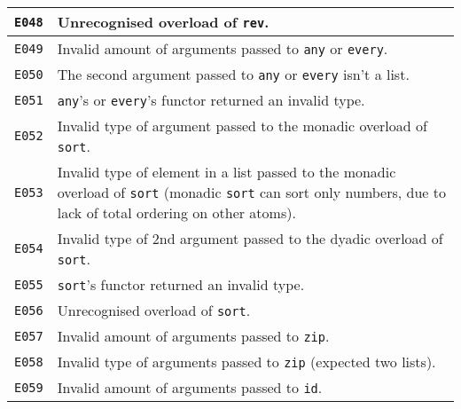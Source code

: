\begin{longtable}{ | p{6em} | p{34em} | }
\verb|E048|          & Unrecognised overload of \verb|rev|.                                                                                                           \\ \hline
\verb|E049|          & Invalid amount of arguments passed to \verb|any| or \verb|every|.                                                                              \\ \hline
\verb|E050|          & The second argument passed to \verb|any| or \verb|every| isn't a list.                                                                         \\ \hline
\verb|E051|          & \verb|any|'s or \verb|every|'s functor returned an invalid type.                                                                               \\ \hline
\verb|E052|          & Invalid type of argument passed to the monadic overload of \verb|sort|.                                                                        \\ \hline
\verb|E053|          & Invalid type of element in a list passed to the monadic overload of \verb|sort| (monadic \verb|sort| can sort only numbers, due to lack of total ordering on other atoms). \\ \hline
\verb|E054|          & Invalid type of 2nd argument passed to the dyadic overload of \verb|sort|.                                                                     \\ \hline
\verb|E055|          & \verb|sort|'s functor returned an invalid type.                                                                                                \\ \hline
\verb|E056|          & Unrecognised overload of \verb|sort|.                                                                                                          \\ \hline
\verb|E057|          & Invalid amount of arguments passed to \verb|zip|.                                                                                              \\ \hline
\verb|E058|          & Invalid type of arguments passed to \verb|zip| (expected two lists).                                                                           \\ \hline
\verb|E059|          & Invalid amount of arguments passed to \verb|id|.                                                                                               \\ \hline

\end{longtable}
